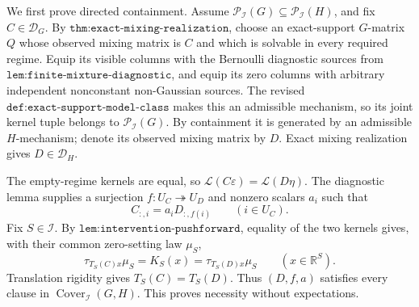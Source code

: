 We first prove directed containment. Assume \(\mathcal P_{\mathcal I}(G)\subseteq\mathcal P_{\mathcal I}(H)\), and fix \(C\in\mathcal D_G\). By \(\texttt{thm:exact-mixing-realization}\), choose an exact-support \(G\)-matrix \(Q\) whose observed mixing matrix is \(C\) and which is solvable in every required regime. Equip its visible columns with the Bernoulli diagnostic sources from \(\texttt{lem:finite-mixture-diagnostic}\), and equip its zero columns with arbitrary independent nonconstant non-Gaussian sources. The revised \(\texttt{def:exact-support-model-class}\) makes this an admissible mechanism, so its joint kernel tuple belongs to \(\mathcal P_{\mathcal I}(G)\). By containment it is generated by an admissible \(H\)-mechanism; denote its observed mixing matrix by \(D\). Exact mixing realization gives \(D\in\mathcal D_H\).

The empty-regime kernels are equal, so \(\mathcal L(C\varepsilon)=\mathcal L(D\eta)\). The diagnostic lemma supplies a surjection \(f:U_C\twoheadrightarrow U_D\) and nonzero scalars \(a_i\) such that
\[
C_{:,i}=a_iD_{:,f(i)}\qquad(i\in U_C). \tag{7}
\]
Fix \(S\in\mathcal I\). By \(\texttt{lem:intervention-pushforward}\), equality of the two kernels gives, with their common zero-setting law \(\mu_S\),
\[
\tau_{T_S(C)x}\mu_S=K_S(x)=\tau_{T_S(D)x}\mu_S
\qquad(x\in\mathbb R^S).
\]
Translation rigidity gives \(T_S(C)=T_S(D)\). Thus \((D,f,a)\) satisfies every clause in \(\operatorname{Cover}_{\mathcal I}(G,H)\). This proves necessity without expectations.


